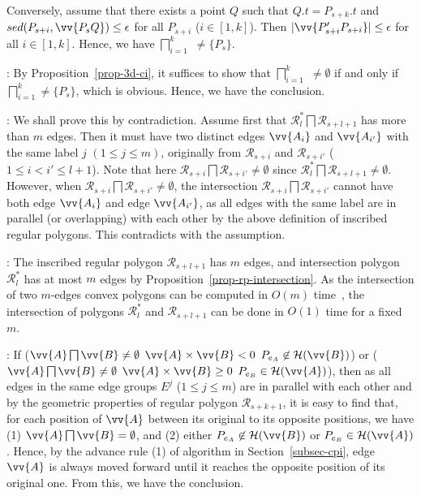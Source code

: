 Conversely, assume that there exists a point $Q$ such that $Q.t = P_{s+k}.t$ and $sed(P_{s+i}, \vv{P_sQ})\le\epsilon$ for all $P_{s+i}$ ($i \in [1,k]$). Then $|\vv{P'_{s+i}P_{s+i}}| \le \epsilon$ for all $i \in [1, k]$. Hence, we have  $\bigsqcap_{i=1}^{k}$ $\ne \{P_s\}$. \eop


:
By Proposition~\ref{prop-3d-ci}, it suffices to show that $\bigsqcap_{i=1}^{k}$  $\ne \emptyset$ if and only if $\bigsqcap_{i=1}^{k}$$\ne \{P_s\}$, which is obvious. Hence, we have the conclusion. \eop



:
We shall prove this by contradiction.
Assume first that $\mathcal{R}^*_{l} \bigsqcap \mathcal{R}_{s+l+1}$ has more than $m$ edges. Then it must have two distinct edges $\vv{A_i}$ and $\vv{A_{i'}}$  with the same label $j$ $(1\le j \le m)$, originally from
$\mathcal{R}_{s+i}$ and $\mathcal{R}_{s+i'}$  ($1\le i< i' \le l+1$).
%
Note that here $\mathcal{R}_{s+i} \bigsqcap \mathcal{R}_{s+i'} \ne \emptyset$ since $\mathcal{R}^*_l \bigsqcap \mathcal{R}_{s+l+1} \ne \emptyset$.
%
However, when $\mathcal{R}_{s+i} \bigsqcap \mathcal{R}_{s+i'} \ne \emptyset$, the intersection $\mathcal{R}_{s+i} \bigsqcap \mathcal{R}_{s+i'}$ cannot have
both edge $\vv{A_i}$ and edge $\vv{A_{i'}}$, as  all edges with the same label are in parallel (or overlapping) with each other by the above definition of inscribed regular polygons. This contradicts with the assumption. \eop


:
The inscribed regular polygon $\mathcal{R}_{s+l+1}$ has $m$ edges, and intersection polygon $\mathcal{R}^*_l$ has at most $m$ edges by Proposition~\ref{prop-rp-intersection}.
As the intersection of two $m$-edges convex polygons can be computed in $O(m)$ time~\cite{ORourke:Intersection}, the intersection of polygons $\mathcal{R}^*_l$ and $\mathcal{R}_{s+l+1}$ can be done in $O(1)$ time for a fixed $m$. \eop


:
If ($\vv{A} \bigsqcap \vv{B} \ne \emptyset$ \And $\vv{A} \times \vv{B} < 0$ \And $P_{e_A} \not \in \mathcal{H}(\vv{B})$) or ($\vv{A} \bigsqcap \vv{B} \ne \emptyset$ \And $\vv{A} \times \vv{B} \ge 0$ \And $P_{e_B} \in \mathcal{H}(\vv{A})$), then as all edges in the same edge groups $E^j$ ($1\le j\le m$) are in parallel with each other and by the geometric properties of regular polygon $\mathcal{R}_{s+k+1}$, it is easy to find that, for each position of $\vv{A}$ between its original to its opposite positions, we have (1) $\vv{A} \bigsqcap \vv{B} = \emptyset$, and (2) either $P_{e_A} \not \in \mathcal{H}(\vv{B})$ or $P_{e_B} \in \mathcal{H}(\vv{A})$. Hence, by the advance rule (1) of algorithm \cpia in Section~\ref{subsec-cpi}, edge $\vv{A}$ is always moved forward until it reaches the opposite position of its original one. From this, we have the conclusion. \eop




